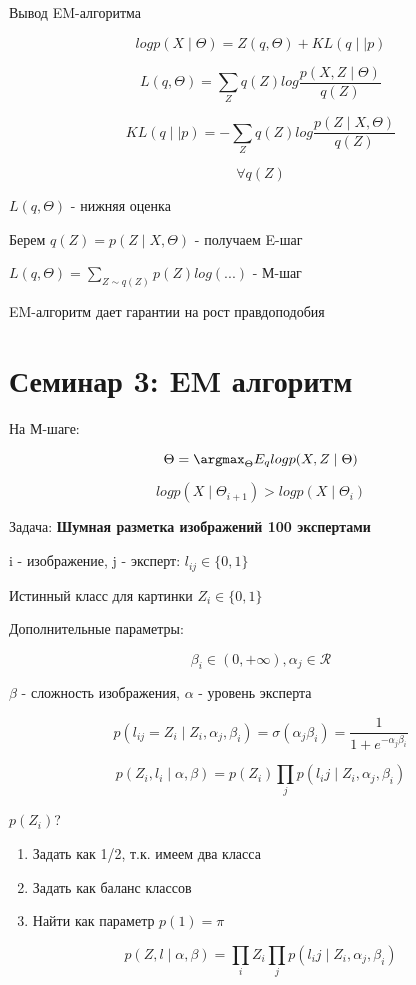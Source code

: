 \documentclass[a4paper, 12pt]{article}
\begin{document}
Вывод EM-алгоритма

\[log p(X \mid \Theta) = Z(q, \Theta) + KL(q \mid \mid p)\]

\[L(q, \Theta) = \sum_{Z} q(Z)log \frac{p(X, Z \mid \Theta)}{q(Z)}\]

\[KL(q \mid \mid p) = -\sum_{Z} q(Z)log \frac{p(Z \mid X, \Theta)}{q(Z)}\]

\[\forall q(Z)\]

\(L(q, \Theta)\) - нижняя оценка

Берем \(q(Z) = p(Z \mid X, \Theta)\) - получаем E-шаг

\(L(q, \Theta) = \sum_{Z \sim q(Z)} p(Z) log(...)\) - М-шаг

EM-алгоритм дает гарантии на рост правдоподобия

\section{Семинар 3: EM алгоритм}

На М-шаге:

\[\Theta = \argmax_{\Theta} E_{q} log p(X, Z \mid \Theta)\]

\[log p(X \mid \Theta_{i + 1}) > log p(X \mid \Theta_{i})\]


Задача: \textbf{Шумная разметка изображений 100 экспертами}

i - изображение, j - эксперт: $l_{ij} \in \{0, 1\}$

Истинный класс для картинки $Z_i \in \{0, 1\}$

Дополнительные параметры:

\[\beta_i \in (0, +\infty), \alpha_j \in \mathcal{R}\]

$\beta$ - сложность изображения, $\alpha$ - уровень эксперта

\[p(l_{ij} = Z_i \mid Z_i, \alpha_j, \beta_i) = \sigma(\alpha_j \beta_i) 
= \frac{1}{1 + e^{-\alpha_j \beta_i}}\]

\[p(Z_i, l_i \mid \alpha, \beta) = 
p(Z_i) \prod_{j} p(l_ij \mid Z_i, \alpha_j, \beta_i)\]

\(p(Z_i)\)?

\begin{enumerate}
    \item Задать как 1/2, т.к. имеем два класса
    \item Задать как баланс классов
    \item Найти как параметр \(p(1) = \pi\)
\end{enumerate}

\[p(Z, l \mid \alpha, \beta) = 
\prod_i Z_i \prod_{j} p(l_ij \mid Z_i, \alpha_j, \beta_i)\]
\end{document}
